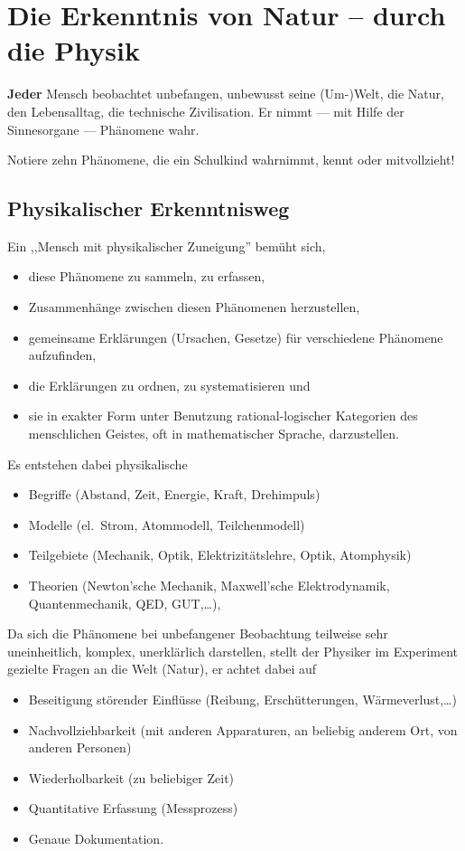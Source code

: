 \chapter{Die Erkenntnis von Natur -- durch die Physik}\label{Erkenntnis}

{\bf Jeder} Mensch beobachtet unbefangen, unbewusst seine (Um-)Welt, die Natur, den Lebensalltag,
die technische Zivilisation. Er nimmt --- mit Hilfe der Sinnesorgane --- Ph\"{a}nomene wahr.

\begin{uea}
	Notiere zehn Ph\"{a}nomene, die ein Schulkind wahrnimmt, kennt oder mitvollzieht!
\end{uea}


\section{Physikalischer Erkenntnisweg}

Ein ,,Mensch mit physikalischer Zuneigung'' bem\"{u}ht sich,
\begin{itemize}
	\item diese Ph\"{a}nomene zu sammeln, zu erfassen,
	\item Zusammenh\"{a}nge zwischen diesen Ph\"{a}nomenen herzustellen,
	\item gemeinsame Erkl\"{a}rungen (Ursachen, Gesetze) f\"{u}r verschiedene Ph\"{a}nomene aufzufinden,
	\item die Erkl\"{a}rungen zu ordnen, zu systematisieren \quad und
	\item sie in exakter Form unter Benutzung rational-logischer Kategorien des menschlichen Geistes, oft in mathematischer Sprache, darzustellen.
\end{itemize}

Es entstehen dabei physikalische
\begin{itemize}
	\item Begriffe (Abstand, Zeit, Energie, Kraft, Drehimpuls)
	\item Modelle (el.\ Strom, Atommodell, Teilchenmodell)
	\item Teilgebiete (Mechanik, Optik, Elektrizit\"{a}tslehre, Optik, Atomphysik)
	\item Theorien (Newton'sche Mechanik, Maxwell'sche Elektrodynamik, Quantenmechanik, QED, GUT,\dots),
\end{itemize}

\mip
Da sich die Ph\"{a}nomene bei unbefangener Beobachtung teilweise sehr uneinheitlich, komplex,
unerkl\"{a}rlich darstellen, stellt der Physiker im Experiment gezielte Fragen an die Welt (Natur),
er achtet dabei auf
\begin{itemize}
	\item Beseitigung st\"{o}render Einfl\"{u}sse (Reibung, Ersch\"{u}tterungen, W\"{a}rmeverlust,\dots )
	\item Nachvollziehbarkeit (mit anderen Apparaturen, an beliebig anderem Ort, von anderen Personen)
	\item Wiederholbarkeit (zu beliebiger Zeit)
	\item Quantitative Erfassung (Messprozess)
	\item Genaue Dokumentation.
\end{itemize}

